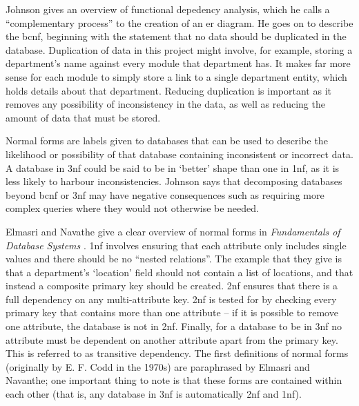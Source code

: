 Johnson gives an overview of functional depedency analysis, which he calls a
``complementary process'' to the creation of an \gls{er} diagram. He goes on
to describe the \gls{bcnf}, beginning with the statement that no data should
be duplicated in the database. Duplication of data in this project might
involve, for example, storing a department's name against every module that
department has. It makes far more sense for each module to simply store a link
to a single department entity, which holds details about that department.
Reducing duplication is important as it removes any possibility of
inconsistency in the data, as well as reducing the amount of data that must be
stored.

Normal forms are labels given to databases that can be used to describe the
likelihood or possibility of that database containing inconsistent or
incorrect data. A database in \gls{3nf} could be said to be in `better' shape
than one in \gls{1nf}, as it is less likely to harbour inconsistencies.
Johnson says that decomposing databases beyond \gls{bcnf} or \gls{3nf} may
have negative consequences such as requiring more complex queries where they
would not otherwise be needed.

Elmasri and Navathe give a clear overview of normal forms in
\emph{Fundamentals of Database Systems} \cite{ElmasriFundamentals_2004}.
\Gls{1nf} involves ensuring that each attribute only includes single values
and there should be no ``nested relations''. The example that they give is
that a department's `location' field should not contain a list of locations,
and that instead a composite primary key should be created. \Gls{2nf} ensures
that there is a full dependency on any multi-attribute key. \Gls{2nf} is
tested for by checking every primary key that contains more than one attribute
-- if it is possible to remove one attribute, the database is not in
\gls{2nf}. Finally, for a database to be in \gls{3nf} no attribute must be
dependent on another attribute apart from the primary key. This is referred to
as transitive dependency. The first definitions of normal forms (originally by
E. F. Codd in the 1970s) are paraphrased by Elmasri and Navanthe; one
important thing to note is that these forms are contained within each other
(that is, any database in \gls{3nf} is automatically \gls{2nf} and \gls{1nf}).
